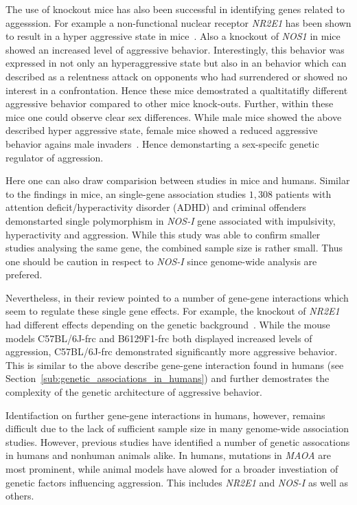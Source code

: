 The use of knockout mice has also been successful in identifying genes related to aggesssion.
For example a non-functional nuclear receptor \textit{NR2E1} has been shown to result in a hyper aggressive state in mice~\cite{Young2002}.
Also a knockout of \textit{NOS1} in mice showed an increased level of aggressive behavior.
Interestingly, this behavior was expressed in not only an hyperaggressive state but also in an behavior which can described as a relentness attack on opponents who had surrendered or showed no interest in a confrontation.
Hence these mice demostrated a qualtitatifly different aggressive behavior compared to other mice knock-outs.
Further, within these mice one could observe clear sex differences.
While male mice showed the above described hyper aggressive state, female mice showed a reduced aggressive behavior agains male invaders~\cite{Gammie1999,Nelson1995}.
Hence demonstarting a sex-specifc genetic regulator of aggression.

Here one can also draw comparision between studies in mice and humans.
Similar to the findings in mice, an single-gene association studies $1,308$ patients with attention deficit/hyperactivity disorder (ADHD) and criminal offenders demonstarted single polymorphism in \textit{NOS-I} gene associated with impulsivity, hyperactivity and aggression.
While this study was able to confirm smaller studies analysing the same gene, the combined sample size is rather small.
Thus one should be caution in respect to \textit{NOS-I} since genome-wide analysis are prefered.

Nevertheless, in their review \citet{Anholt2012} pointed to a number of gene-gene interactions which seem to regulate these single gene effects.
For example, the knockout of \textit{NR2E1} had different effects depending on the genetic background~\cite{Young2002}.
While the mouse models C57BL/6J-frc and B6129F1-frc both displayed increased levels of aggression, C57BL/6J-frc demonstrated significantly more aggressive behavior.
This is similar to the above describe gene-gene interaction found in humans (see Section~\ref{sub:genetic_associations_in_humans}) and further demostrates the complexity of the genetic architecture of aggressive behavior.

Identifaction on further gene-gene interactions in humans, however, remains difficult due to the lack of sufficient sample size in many genome-wide association studies.
However, previous studies have identified a number of genetic assocations in humans and nonhuman animals alike.
In humans, mutations in \textit{MAOA} are most prominent, while animal models have alowed for a broader investiation of genetic factors influencing aggression.
This includes \textit{NR2E1} and \textit{NOS-I} as well as others.

